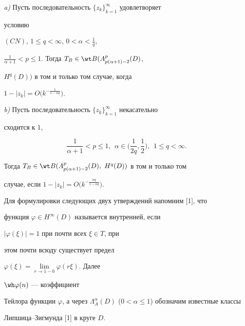  


\begin{thm} 


{\em a)} Пусть последовательность $\{z_k\}^\infty_{k=1}$ удовлетворяет 


условию 


$(C N)$, $1{\le} q{<}\infty$, $0<\alpha<\frac{1}{q}$, 


$\frac{1}{\alpha+1}<p\le1$. Тогда $T_B\in\wt B(A^p_{p(\alpha+1)-2}(D)$, 


$H^q(D))$ в том и только том случае, когда 


$1-|z_k|=O\big(k^{-\frac{1}{1-\alpha q}}\big)$. 


 


{\em b)} Пусть последовательность $\{z_k\}^\infty_{k=1}$ некасательно 


сходится к $1$, 


$$ 


\frac{1}{\alpha+1}<p\le1,\ \ \alpha\in\bigg(\frac{1}{2q},\frac{1}{2} 


\bigg),\ \ 1\le q<\infty. 


$$ 


 


Тогда $T_B\in\wt B(A^p_{p(\alpha+1)-2}(D),\ H^q(D))$ в том и только том 


случае, если $1-|z_k|=O\big(k^{-\frac{\alpha q}{1-\alpha q}}\big)$. 


\end{thm} 


 


Для формулировки следующих двух утверждений напомним [1], что 


функция $\varphi\in H^\infty(D)$ называется внутренней, если 


$|\varphi(\xi)|=1$ при почти всех $\xi\in T$, при 


этом почти всюду существует предел 


$\varphi(\xi)=\lim\limits_{r\to1-0}\varphi(r\xi)$. Далее 


$\wh\varphi(n)$ --- коэффициент 


Тейлора функции $\varphi$, а через $\Lambda^\alpha_A(D)$ ($0<\alpha\le 


1$) обозначим известные классы 


Липшица--Зигмунда [1] в круге $D$. 


 


